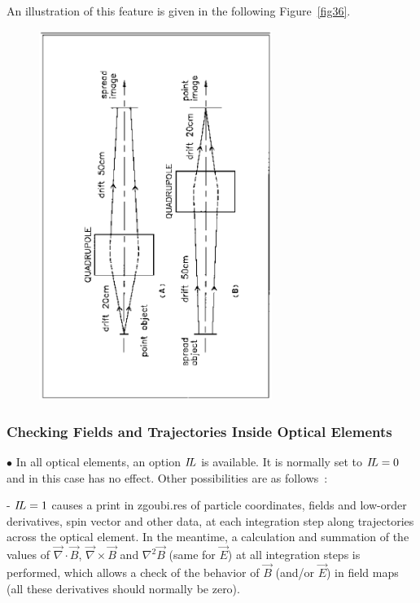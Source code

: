 {\noindent An illustration of this feature is given in the following
Figure~\ref{fig36}.    


\begin{figure}[h]
\centerline{\includegraphics[height=12cm,angle=-90]{Fig36.ps}}
\end{figure}


\subsubsection{Checking Fields and Trajectories Inside Optical Elements}  \label{sec4.6.1}

{\small $\bullet$} In all optical elements, an option $ I\!L $ is available.  It
is normally set to $I\!L =0$ and in this case has no effect. Other possibilities are as follows~: 

\smallskip 

- $ I\!L=1 $ causes a print  in zgoubi.res  of particle 
coordinates, fields and low-order derivatives, spin vector and other data, 
at each integration step along trajectories across the optical element.  In the meantime, a calculation and summation of
the values of $ \vec  \nabla \cdot\vec  B$, 
 $ \vec  \nabla \times\vec  B $ and $ \nabla^2\vec  B $ (same for $\vec E$) at all 
integration steps is performed, which allows a check of the behavior of 
$ \vec  B $ (and/or $ \vec  E $) in field maps (all these derivatives should normally be zero).

}
